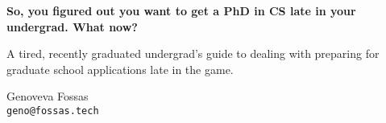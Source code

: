 \begin{titlepage}
    \begin{center}
        \vspace*{1cm}

        \Huge
        \textbf{So, you figured out you want to get a PhD in 
                CS late in your undergrad. What now?}
 
        \large
        \vspace{0.5cm}

        A tired, recently graduated undergrad’s guide to dealing
        with preparing for graduate school applications late in the game.
             
        \vspace{1.5cm}

        \vfill

        \small
        Genoveva Fossas \\
        \texttt{geno@fossas.tech}
             
    \end{center}
 \end{titlepage}